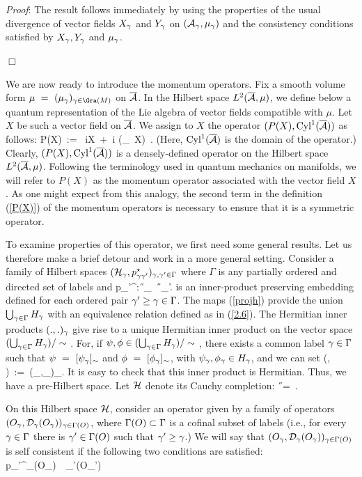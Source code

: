 {\it Proof}{\rm :} The result follows immediately by using the
properties of the usual divergence of vector fields $X_\gamma$ and $Y_\gamma$
on $({\cal A}_\gamma,\mu_\gamma)$ and the consistency conditions satisfied by $X_\gamma,
Y_\gamma$ and $\mu_\gamma$.

$\Box$

\bigskip 

We are now ready to introduce the momentum operators.  Fix a smooth
volume form $\mu \ =\ (\mu_\g)_{\g\in \Gra(\S)}$ on ${\overline {{\cal A}}}$.  In the
Hilbert space $L^2({\overline {{\cal A}}},\mu)$, we define below a quantum representation
of the Lie algebra of vector fields compatible with $\mu$. Let $X$ be
such a vector field on ${\overline {{\cal A}}}$. We assign to $X$ the operator $(P(X),
{\rm Cyl}^1({\overline {{\cal A}}}))$ as follows:
\be \label{P(X)}
P(X)\ := \ iX\ +\ {i} (\div_\mu\ X)\ .
\ee
(Here, ${\rm Cyl}^1({\overline {{\cal A}}})$ is the domain of the operator.) Clearly, $(P(X), 
{\rm Cyl}^1({\overline {{\cal A}}}))$ is a densely-defined operator on the Hilbert space
$L^2({\overline {{\cal A}}}, \mu)$.  Following the terminology used in quantum mechanics
on manifolds, we will refer to $P(X)$ as the momentum operator
associated with the vector field $X$. As one might expect from this
analogy, the second term in the definition (\ref{P(X)}) of the
momentum operators is necessary to ensure that it is a symmetric
operator.

To examine properties of this operator, we first need some general
results. Let us therefore make a brief detour and work in a more
general setting. Consider a family of Hilbert spaces $({\cal H}_\gamma, p_{\gamma
\gamma'}^\star)_{\gamma, \gamma' \in \Gamma}$ where $\Gamma$ is any partially ordered
and directed set of labels and
\be \label{projh}
p_{\g \g'}^\star:\ \H_\g\ \rightarrow\ \H_{\g'}.  
\ee 
is an inner-product preserving embedding defined for each ordered pair
$\gamma'\ge\gamma\in\Gamma$. The maps (\ref{projh}) provide the union
$\bigcup_{\gamma\in\Gamma}H_\gamma$ with an equivalence relation defined as in
(\ref{2.6}). The Hermitian inner products $(.,.)_\gamma$ give rise to a
unique Hermitian inner product on the vector space $(\bigcup_{\gamma\in
\Gamma} H_\gamma) /\sim$ . For, if $\psi,\phi\in (\bigcup_{\gamma\in\Gamma}
H_\gamma)/\sim$ , there exists a common label $\gamma\in\Gamma$ such that
$\psi\ =\ [\psi_\gamma]_\sim$ and $\phi\ =\ [\phi_\gamma]_\sim$, with $\psi_\gamma,
\phi_\gamma\in H_\gamma$, and we can set
\be
(\psi, \phi)\ :=\ (\psi_\g,\phi_\g)_\g.
\ee
It is easy to check that this inner product is Hermitian.  Thus, we
have a pre-Hilbert space. Let ${\cal H}$ denote its Cauchy completion:
\be
\H\ =\  \overline{\bigcup_{\g\in\Ga}\H_\g/\sim}.
\ee

On this Hilbert space ${\cal H}$, consider an operator given by a family of
operators $(O_\gamma, {\cal D}_{\gamma}(O_\gamma))_{\gamma\in\Gamma(O)}$, where
$\Gamma(O)\subset\Gamma$ is a cofinal subset of labels (i.e., for every
$\gamma\in\Gamma$ there is $\gamma'\in\Gamma(O)$ such that $\gamma'\ge\gamma$.) We
will say that $(O_\gamma, {\cal D}_{\gamma}(O_\gamma))_{\gamma\in\Gamma(O)}$ is self consistent
if the following two conditions are satisfied:
\be \label{01}
p_{\g\g'}^\star\D_\g(O_\g)\ \subseteq\ \D_{\g'}(O_{\g'})
\ee

